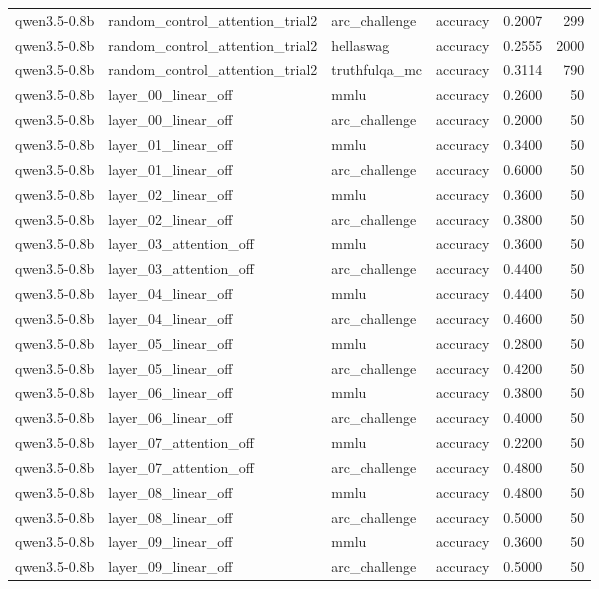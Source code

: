 \begin{tabular}{llllrr}
qwen3.5-0.8b & random_control_attention_trial2 & arc_challenge & accuracy & 0.2007 & 299 \\
qwen3.5-0.8b & random_control_attention_trial2 & hellaswag & accuracy & 0.2555 & 2000 \\
qwen3.5-0.8b & random_control_attention_trial2 & truthfulqa_mc & accuracy & 0.3114 & 790 \\
qwen3.5-0.8b & layer_00_linear_off & mmlu & accuracy & 0.2600 & 50 \\
qwen3.5-0.8b & layer_00_linear_off & arc_challenge & accuracy & 0.2000 & 50 \\
qwen3.5-0.8b & layer_01_linear_off & mmlu & accuracy & 0.3400 & 50 \\
qwen3.5-0.8b & layer_01_linear_off & arc_challenge & accuracy & 0.6000 & 50 \\
qwen3.5-0.8b & layer_02_linear_off & mmlu & accuracy & 0.3600 & 50 \\
qwen3.5-0.8b & layer_02_linear_off & arc_challenge & accuracy & 0.3800 & 50 \\
qwen3.5-0.8b & layer_03_attention_off & mmlu & accuracy & 0.3600 & 50 \\
qwen3.5-0.8b & layer_03_attention_off & arc_challenge & accuracy & 0.4400 & 50 \\
qwen3.5-0.8b & layer_04_linear_off & mmlu & accuracy & 0.4400 & 50 \\
qwen3.5-0.8b & layer_04_linear_off & arc_challenge & accuracy & 0.4600 & 50 \\
qwen3.5-0.8b & layer_05_linear_off & mmlu & accuracy & 0.2800 & 50 \\
qwen3.5-0.8b & layer_05_linear_off & arc_challenge & accuracy & 0.4200 & 50 \\
qwen3.5-0.8b & layer_06_linear_off & mmlu & accuracy & 0.3800 & 50 \\
qwen3.5-0.8b & layer_06_linear_off & arc_challenge & accuracy & 0.4000 & 50 \\
qwen3.5-0.8b & layer_07_attention_off & mmlu & accuracy & 0.2200 & 50 \\
qwen3.5-0.8b & layer_07_attention_off & arc_challenge & accuracy & 0.4800 & 50 \\
qwen3.5-0.8b & layer_08_linear_off & mmlu & accuracy & 0.4800 & 50 \\
qwen3.5-0.8b & layer_08_linear_off & arc_challenge & accuracy & 0.5000 & 50 \\
qwen3.5-0.8b & layer_09_linear_off & mmlu & accuracy & 0.3600 & 50 \\
qwen3.5-0.8b & layer_09_linear_off & arc_challenge & accuracy & 0.5000 & 50 \\

\end{tabular}
